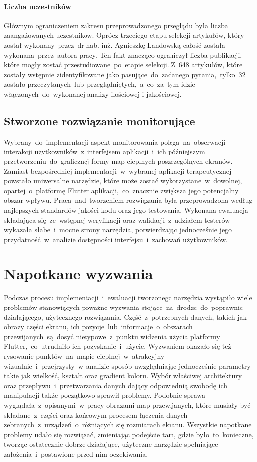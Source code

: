 \paragraph{Liczba uczestników}
Głównym ograniczeniem zakresu przeprowadzonego przeglądu była liczba zaangażowanych uczestników. Oprócz trzeciego etapu selekcji artykułów, który został wykonany~przez~dr hab. inż. Agnieszkę Landowską całość została wykonana~przez~autora pracy. Ten fakt znacząco ograniczył liczba publikacji, które mogły zostać przestudiowane~po~etapie selekcji. Z~648 artykułów, które zostały wstępnie zidentyfikowane jako pasujące~do~zadanego pytania,~tylko~32 zostało przeczytanych~lub~przeglądniętych,~a~co~za~tym idzie włączonych~do~wykonanej analizy ilościowej i jakościowej.

\subsection{Stworzone rozwiązanie monitorujące}
Wybrany~do~implementacji aspekt monitorowania polega~na~obserwacji interakcji użytkowników~z~interfejsem aplikacji~i~ich późniejszym przetworzeniu~do~graficznej formy map cieplnych poszczególnych ekranów. Zamiast bezpośredniej implementacji~w~wybranej aplikacji terapeutycznej powstało uniwersalne narzędzie, które może zostać wykorzystane~w~dowolnej, opartej~o~platformę Flutter aplikacji,~co~znacznie zwiększa jego potencjalny obszar wpływu. Praca~nad~tworzeniem rozwiązania była przeprowadzona według najlepszych standardów jakości kodu oraz jego testowania. Wykonana ewaluacja składająca się~ze~wstępnej weryfikacji oraz walidacji~z~udziałem testerów wykazała słabe~i~mocne strony narzędzia, potwierdzając jednocześnie jego przydatność~w~analizie dostępności interfejsu~i~zachowań użytkowników. 
	
\section{Napotkane wyzwania}
Podczas procesu implementacji~i~ewaluacji tworzonego narzędzia wystąpiło wiele problemów stanowiących poważne wyzwania stojące~na~drodze~do~poprawnie działającego, użytecznego rozwiązania. Część~z~potrzebnych danych, takich jak obrazy części ekranu, ich pozycje~lub~informacje~o~obszarach przewijanych~są~dosyć nietypowe~z~punktu widzenia użycia platformy Flutter,~co~utrudniło ich pozyskanie~i~użycie. Wyzwaniem okazało się też rysowanie punktów~na~mapie cieplnej~w~atrakcyjny wizualnie~i~przejrzysty~w~analizie sposób uwzględniając jednocześnie parametry takie jak wielkość, kształt oraz gradient koloru. Wybór właściwej architektury oraz przepływu~i~przetwarzania danych dający odpowiednią swobodę ich manipulacji także początkowo sprawił problemy. Podobnie sprawa wyglądała~z~opisanymi~w~pracy obrazami map przewijanych, które musiały być składane~z~części oraz końcowym procesem łączenia danych zebranych~z~urządzeń~o~różniących się rozmiarach ekranu. Wszystkie napotkane problemy udało się rozwiązać, zmieniając podejście tam, gdzie było~to~konieczne, tworząc ostatecznie dobrze działające, użyteczne narzędzie spełniające założenia~i~postawione przed nim oczekiwania.
